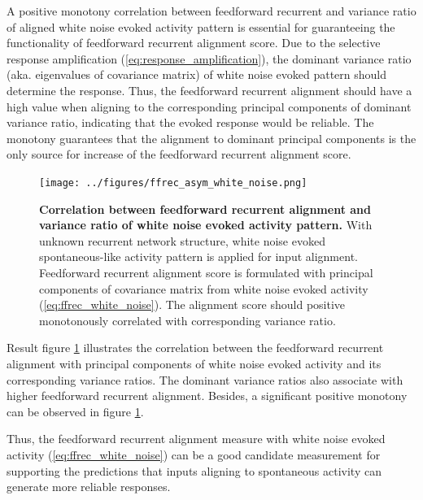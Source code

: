 \documentclass[11pt]{article}
\begin{document}
	A positive monotony correlation between feedforward recurrent and variance ratio of aligned white noise evoked activity pattern is essential for guaranteeing the functionality of feedforward recurrent alignment score. %
	Due to the selective response amplification (\ref{eq:response_amplification}), the dominant variance ratio (aka. eigenvalues of covariance matrix) of white noise evoked pattern should determine the response. Thus, the feedforward recurrent alignment should have a high value when aligning to the corresponding principal components of dominant variance ratio, indicating that the evoked response would be reliable. The monotony guarantees that the alignment to dominant principal components is the only source for increase of the feedforward recurrent alignment score. 
	
		\begin{figure} 
			\centering
			\caption{\textbf{Correlation between feedforward recurrent alignment and variance ratio of white noise evoked activity pattern.} With unknown recurrent network structure, white noise evoked spontaneous-like activity pattern is applied for input alignment. Feedforward recurrent alignment score is formulated with principal components of covariance matrix from white noise evoked activity (\ref{eq:ffrec_white_noise}). The alignment score should positive monotonously correlated with corresponding variance ratio.}
			\texttt{[image: ../figures/ffrec\_asym\_white\_noise.png]}
			\label{fig:ffrec_variance_ratio_white_noise}
		\end{figure}
	
	Result figure \ref{fig:ffrec_variance_ratio_white_noise} illustrates the correlation between the feedforward recurrent alignment with principal components of white noise evoked activity and its corresponding variance ratios. The dominant variance ratios also associate with higher feedforward recurrent alignment. Besides, a significant positive monotony can be observed in figure \ref{fig:ffrec_variance_ratio_white_noise}.
	
	Thus, the feedforward recurrent alignment measure with white noise evoked activity (\ref{eq:ffrec_white_noise}) can be a good candidate measurement for supporting the predictions that inputs aligning to spontaneous activity can generate more reliable responses. 
	
\end{document}
